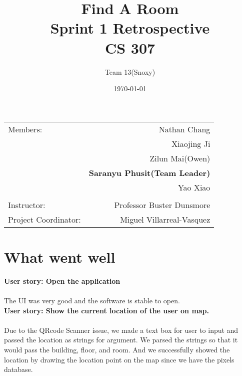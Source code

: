 \documentclass[12pt]{article}
\title{\textbf{Find A Room} \\ Sprint 1 Retrospective \\ CS 307} %
\author{Team \textsc{13}(Snoxy)} %
\date{\today} %
\begin{document}
\maketitle %

\begin{center}
\begin{tabular}{l r}
Members: & Nathan Chang \\ %
& Xiaojing Ji \\
& Zilun Mai(Owen) \\
& \textbf{Saranyu Phusit(Team Leader)} \\
& Yao Xiao \\
\\
\bigskip
Instructor: & Professor Buster Dunsmore \\%
Project Coordinator: & Miguel Villarreal-Vasquez %

\end{tabular}
\end{center}

\newpage




\newpage
\section{What went well}

\textbf{User story: Open the application} \\ \\
The UI was very good and the software is stable to open. \\

\textbf{User story:  Show the current location of the user on map.} \\ \\
Due to the QRcode Scanner issue, we made a text box for user to input and passed the location as strings for argument. We parsed the strings so that it would pass the building, floor, and room. And we successfully showed the location by drawing the location point on the map since we have the pixels database. \\
\end{document}
